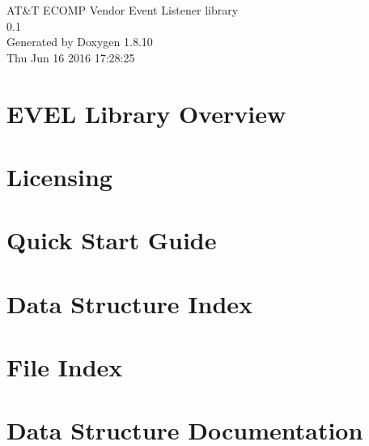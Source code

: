 \documentclass[twoside]{book}
\newcommand{\+}{\discretionary{\mbox{\scriptsize$\hookleftarrow$}}{}{}}
\newcommand{\clearemptydoublepage}{%
  \newpage{\pagestyle{empty}\cleardoublepage}%
}
\begin{document}
\hypersetup{pageanchor=false,
             bookmarks=true,
             bookmarksnumbered=true,
             pdfencoding=unicode
            }
\begin{titlepage}
\vspace*{7cm}
\begin{center}%
{\Large A\+T\&T E\+C\+O\+M\+P Vendor Event Listener library \\[1ex]\large 0.\+1 }\\
\vspace*{1cm}
{\large Generated by Doxygen 1.8.10}\\
\vspace*{0.5cm}
{\small Thu Jun 16 2016 17:28:25}\\
\end{center}
\end{titlepage}
\clearemptydoublepage
\tableofcontents
\clearemptydoublepage
{}
\hypersetup{pageanchor=true}

\chapter{E\+V\+E\+L Library Overview}
\label{index}\hypertarget{index}{}
\chapter{Licensing}
\label{licensing}
\hypertarget{licensing}{}

\chapter{Quick Start Guide}
\label{quickstart}
\hypertarget{quickstart}{}

\chapter{Data Structure Index}

\chapter{File Index}

\chapter{Data Structure Documentation}




















\end{document}
